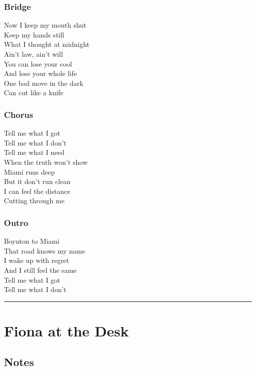 \documentclass[]{article}
\begin{document}
\subsubsection{Bridge}\label{bridge-6}

Now I keep my mouth shut\\
Keep my hands still\\
What I thought at midnight\\
Ain't law, ain't will\\
You can lose your cool\\
And lose your whole life\\
One bad move in the dark\\
Can cut like a knife

\subsubsection{Chorus}\label{chorus-27}

Tell me what I got\\
Tell me what I don't\\
Tell me what I need\\
When the truth won't show\\
Miami runs deep\\
But it don't run clean\\
I can feel the distance\\
Cutting through me

\subsubsection{Outro}\label{outro-3}

Boynton to Miami\\
That road knows my name\\
I wake up with regret\\
And I still feel the same\\
Tell me what I got\\
Tell me what I don't

\begin{center}\rule{0.5\linewidth}{0.5pt}\end{center}

\section{Fiona at the Desk}\label{fiona-at-the-desk}

\subsection{Notes}\label{notes-18}
\end{document}
